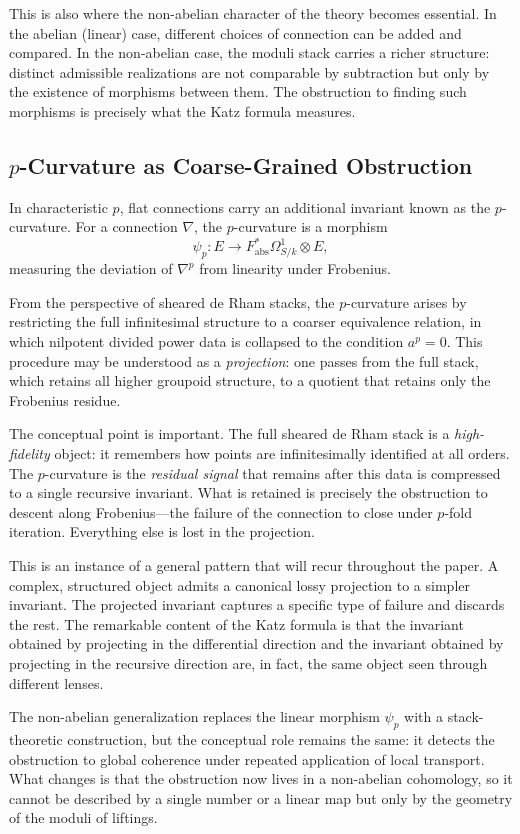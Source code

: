 \documentclass[12pt]{article}
\begin{document}
This is also where the non-abelian character of the theory becomes essential. In the
abelian (linear) case, different choices of connection can be added and compared.
In the non-abelian case, the moduli stack carries a richer structure: distinct
admissible realizations are not comparable by subtraction but only by the existence of
morphisms between them. The obstruction to finding such morphisms is precisely what
the Katz formula measures.

\subsection{$p$-Curvature as Coarse-Grained Obstruction}

In characteristic $p$, flat connections carry an additional invariant known as the
$p$-curvature. For a connection $\nabla$, the $p$-curvature is a morphism
\[
\psi_p : E \to F^*_{\mathrm{abs}}\Omega^1_{S/k} \otimes E,
\]
measuring the deviation of $\nabla^p$ from linearity under Frobenius.

From the perspective of sheared de Rham stacks, the $p$-curvature arises by
restricting the full infinitesimal structure to a coarser equivalence relation, in
which nilpotent divided power data is collapsed to the condition $a^p = 0$. This
procedure may be understood as a \emph{projection}: one passes from the full stack,
which retains all higher groupoid structure, to a quotient that retains only the
Frobenius residue.

The conceptual point is important. The full sheared de Rham stack is a
\emph{high-fidelity} object: it remembers how points are infinitesimally identified at
all orders. The $p$-curvature is the \emph{residual signal} that remains after this
data is compressed to a single recursive invariant. What is retained is precisely the
obstruction to descent along Frobenius---the failure of the connection to close under
$p$-fold iteration. Everything else is lost in the projection.

This is an instance of a general pattern that will recur throughout the paper. A
complex, structured object admits a canonical lossy projection to a simpler invariant.
The projected invariant captures a specific type of failure and discards the rest. The
remarkable content of the Katz formula is that the invariant obtained by projecting in
the differential direction and the invariant obtained by projecting in the recursive
direction are, in fact, the same object seen through different lenses.

The non-abelian generalization replaces the linear morphism $\psi_p$ with a
stack-theoretic construction, but the conceptual role remains the same: it detects the
obstruction to global coherence under repeated application of local transport. What
changes is that the obstruction now lives in a non-abelian cohomology, so it cannot
be described by a single number or a linear map but only by the geometry of the
moduli of liftings.
\end{document}

